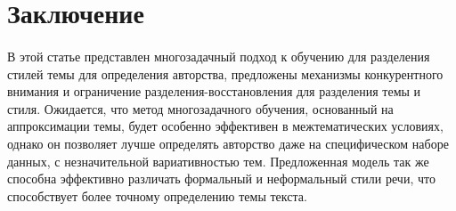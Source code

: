 \documentclass{article}
\begin{document}
\section{Заключение}
\paragraph*{} В этой статье представлен многозадачный подход 
к обучению для разделения стилей темы для определения 
авторства, предложены механизмы конкурентного внимания 
и ограничение разделения-восстановления 
для разделения темы и стиля. Ожидается, 
что метод многозадачного обучения, основанный на аппроксимации темы, будет особенно эффективен в межтематических условиях, однако он позволяет лучше определять 
авторство даже на специфическом наборе 
данных, с незначительной вариативностью 
тем. Предложенная модель так же способна 
эффективно различать формальный и неформальный стили речи, что способствует более 
точному определению темы текста. 

\renewcommand{\refname}{\centering Список литературы}
\end{document}
